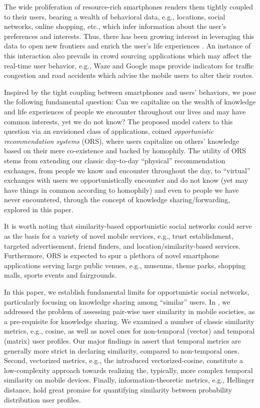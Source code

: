 \documentclass[conference]{IEEEtran}
\theoremstyle{definition}
\begin{document}
The wide proliferation of resource-rich smartphones renders them tightly coupled to their users, bearing a wealth of behavioral data, e.g., locations, social networks, online shopping, etc., which infer information about the user's preferences and interests. Thus, there has been growing interest in leveraging this data to open new frontiers and enrich the user's life experiences \cite{Eagle}. An instance of this interaction also prevails in crowd sourcing applications which may affect the real-time user behavior, e.g., Waze and Google maps provide indicators for traffic congestion and road accidents which advise the mobile users to alter their routes.

Inspired by the tight coupling between smartphones and users' behaviors, we pose the following fundamental question: Can we capitalize on the wealth of knowledge and life experiences of people we encounter throughout our lives and may have common interests, yet we do not know? The proposed model caters to this question via an envisioned class of applications, coined {\it opportunistic recommendation systems} (ORS), where users capitalize on others' knowledge based on their mere co-existence and backed by homophily. The utility of ORS stems from extending our classic day-to-day ``physical'' recommendation exchanges, from people we know and encounter throughout the day, to ``virtual'' exchanges with users we opportunistically encounter and do not know (yet may have things in common according to homophily) and even to people we have never encountered, through the concept of knowledge sharing/forwarding, explored in this paper.

It is worth noting that similarity-based opportunistic social networks could serve as the basis for a variety of novel mobile services, e.g., trust establishment, targeted advertisement, friend finders, and location/similarity-based services. Furthermore, ORS is expected to spur a plethora of novel smartphone applications serving large public venues, e.g., museums, theme parks, shopping malls, sports events and fairgrounds.


In this paper, we establish fundamental limits for opportunistic social 
networks, particularly focusing on knowledge sharing among ``similar'' users. 
In \cite{mai14}, we addressed the problem of assessing pair-wise user similarity
in mobile societies, as a pre-requisite for knowledge sharing. We examined a 
number of classic similarity metrics, e.g., cosine, as well as novel ones 
for non-temporal (vector) and temporal (matrix) user profiles. Our major findings 
in \cite{mai14} assert that temporal metrics are generally more strict in declaring similarity, 
compared to non-temporal ones. Second, vectorized metrics, e.g., the introduced 
vectorized-cosine, constitute a low-complexity approach towards realizing the, typically, more complex temporal similarity on mobile devices. Finally, information-theoretic metrics, e.g., Hellinger distance, hold great promise for quantifying similarity between probability distribution user profiles. 
\end{document}
